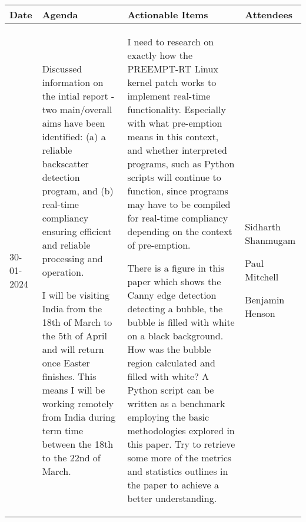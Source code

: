 \begin{table}[!h]
    \centering
    \begin{tabularx}{\textwidth}{|l|X|X|X|}
        \hline
        Date & Agenda & Actionable Items & Attendees \\
        \hline
        \hline
        30-01-2024 & 
        \begin{myitemize}
            \item Discussed information on the intial report - two main/overall aims have been identified: (a) a reliable backscatter detection program, and (b) real-time compliancy ensuring efficient and reliable processing and operation.
            \item I will be visiting India from the 18th of March to the 5th of April and will return once Easter finishes. This means I will be working remotely from India during term time between the 18th to the 22nd of March.
        \end{myitemize} &
        \begin{myitemize}
            \item I need to research on exactly how the PREEMPT-RT Linux kernel patch works to implement real-time functionality. Especially with what pre-emption means in this context, and whether interpreted programs, such as Python scripts will continue to function, since programs may have to be compiled for real-time compliancy depending on the context of pre-emption.
            \item There is a figure in this paper which shows the Canny edge detection detecting a bubble, the bubble is filled with white on a black background. How was the bubble region calculated and filled with white? A Python script can be written as a benchmark employing the basic methodologies explored in this paper. Try to retrieve some more of the metrics and statistics outlines in the paper to achieve a better understanding.
        \end{myitemize} &
        \begin{myitemize}
            \item Sidharth Shanmugam
            \item Paul Mitchell
            \item Benjamin Henson
        \end{myitemize} \\
        \hline
    \end{tabularx}
\end{table}

\pagebreak

